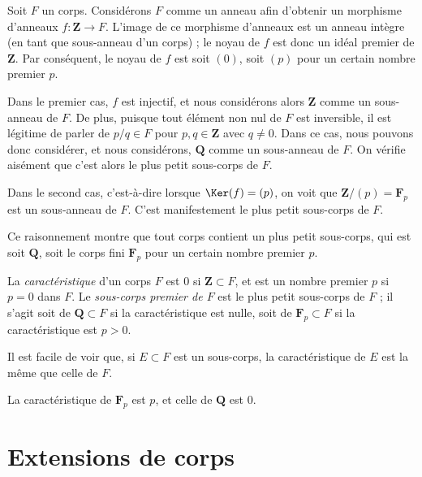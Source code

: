 \medskip\noindent
Soit $F$ un corps. Considérons $F$ comme un anneau afin d'obtenir un morphisme d'anneaux
$f : \mathbf{Z} \to F$. L'image de ce morphisme d'anneaux est un anneau intègre
(en tant que sous-anneau d'un corps) ; le noyau de $f$ est donc un idéal premier
de $\mathbf{Z}$. Par conséquent, le noyau de $f$ est soit $(0)$, soit $(p)$ pour
un certain nombre premier $p$.

\medskip\noindent
Dans le premier cas, $f$ est injectif, et nous considérons alors
$\mathbf{Z}$ comme un sous-anneau de $F$. De plus, puisque tout
élément non nul de $F$ est inversible, il est légitime de
parler de $p/q \in F$ pour $p, q \in \mathbf{Z}$ avec $q \not = 0$.
Dans ce cas, nous pouvons donc considérer, et nous considérons, $\mathbf{Q}$ comme un sous-anneau de $F$.
On vérifie aisément que c'est alors le plus petit sous-corps de $F$.

\medskip\noindent
Dans le second cas, c'est-à-dire lorsque $\Ker(f) = (p)$, on voit que
$\mathbf{Z}/(p) = \mathbf{F}_p$ est un sous-anneau de $F$. C'est manifestement le
plus petit sous-corps de $F$.

\medskip\noindent
Ce raisonnement montre que tout corps contient un plus petit sous-corps,
qui est soit $\mathbf{Q}$, soit le corps fini $\mathbf{F}_p$ pour un certain
nombre premier $p$.

\begin{definition}
\label{definition-characteristic}
La {\it caractéristique} d'un corps $F$ est $0$ si
$\mathbf{Z} \subset F$, et est un nombre premier $p$ si $p = 0$ dans $F$.
Le {\it sous-corps premier de $F$} est le plus petit sous-corps de $F$ ;
il s'agit soit de $\mathbf{Q} \subset F$ si la caractéristique est nulle, soit de
$\mathbf{F}_p \subset F$ si la caractéristique est $p > 0$.
\end{definition}

\noindent
Il est facile de voir que, si $E \subset F$ est un sous-corps, la
caractéristique de $E$ est la même que celle de $F$.

\begin{example}
\label{example-characteristic}
La caractéristique de $\mathbf{F}_p$ est $p$, et celle de $\mathbf{Q}$ est $0$.
\end{example}


\section{Extensions de corps}
\label{section-extensions}

